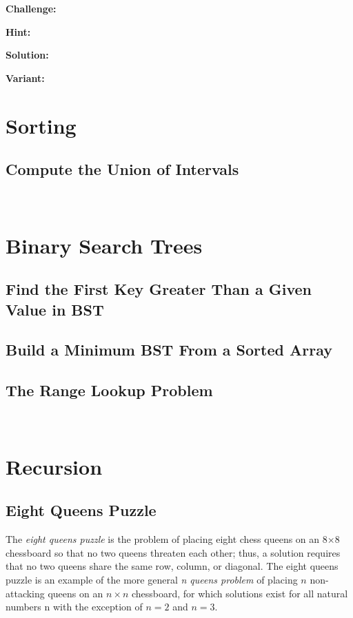 \documentclass[11pt,a4paper]{article}
\begin{document}
\textbf{Challenge:} 

\textbf{Hint:} 

\textbf{Solution:} 

\textbf{Variant:} 


\section{Sorting}

\subsection{Compute the Union of Intervals}

\ %

\section{Binary Search Trees}

\subsection{Find the First Key Greater Than a Given Value in BST}

\subsection{Build a Minimum BST From a Sorted Array}

\subsection{The Range Lookup Problem}

\ %

\section{Recursion}

\subsection{Eight Queens Puzzle}

The \emph{eight queens puzzle} is the problem of placing eight chess queens on
an 8×8 chessboard so that no two queens threaten each other; thus, a solution
requires that no two queens share the same row, column, or diagonal. The eight
queens puzzle is an example of the more general \emph{n queens problem} of
placing $n$ non-attacking queens on an $n\times n$ chessboard, for which
solutions exist for all natural numbers n with the exception of $n = 2$ and $n
= 3$.
\end{document}
